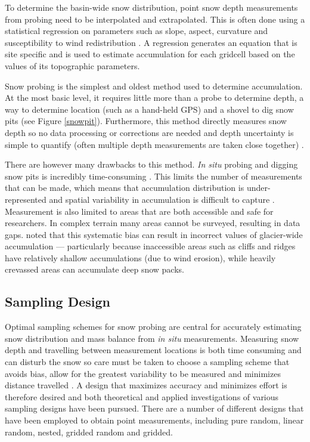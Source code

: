 \documentclass{sfuthesis}
\begin{document}
To determine the basin-wide snow distribution, point snow depth measurements from probing need to be interpolated and extrapolated. This is often done using a statistical regression on parameters such as slope, aspect, curvature and susceptibility to wind redistribution \citep[e.g.][]{Wheler2014,McGrath2015}. A regression generates an equation that is site specific and is used to estimate accumulation for each gridcell based on the values of its topographic parameters. 

Snow probing is the simplest and oldest method used to determine accumulation. At the most basic level, it requires little more than a probe to determine depth, a way to determine location (such as a hand-held GPS) and a shovel to dig snow pits (see Figure \ref{snowpit}). Furthermore, this method directly measures snow depth so no data processing or corrections are needed and depth uncertainty is simple to quantify (often multiple depth measurements are taken close together) \citep{Sold2013}. 

There are however many drawbacks to this method. \textit{In situ} probing and digging snow pits is incredibly time-consuming \citep{Deems2006}. This limits the number of measurements that can be made, which means that accumulation distribution is under-represented and spatial variability in accumulation is difficult to capture \citep{Sold2014}. Measurement is also limited to areas that are both accessible and safe for researchers. In complex terrain many areas cannot be surveyed, resulting in data gaps. \cite{Sold2013} noted that this systematic bias can result in incorrect values of glacier-wide accumulation --- particularly because inaccessible areas such as cliffs and ridges have relatively shallow accumulations (due to wind erosion), while heavily crevassed areas can accumulate deep snow packs. 

\subsection{Sampling Design}

Optimal sampling schemes for snow probing are central for accurately estimating snow distribution and mass balance from \textit{in situ} measurements. Measuring snow depth and travelling between measurement locations is both time consuming and can disturb the snow so care must be taken to choose a sampling scheme that avoids bias, allow for the greatest variability to be measured and minimizes distance travelled \citep{Shea2010}. A design that maximizes accuracy and minimizes effort is therefore desired \citep{Elder1991} and both theoretical \citep{Trujillo2015} and applied \citep{Kronholm2004,Shea2010} investigations of various sampling designs have been pursued. There are a number of different designs that have been employed to obtain point measurements, including pure random, linear random, nested, gridded random and gridded. 
\end{document}

